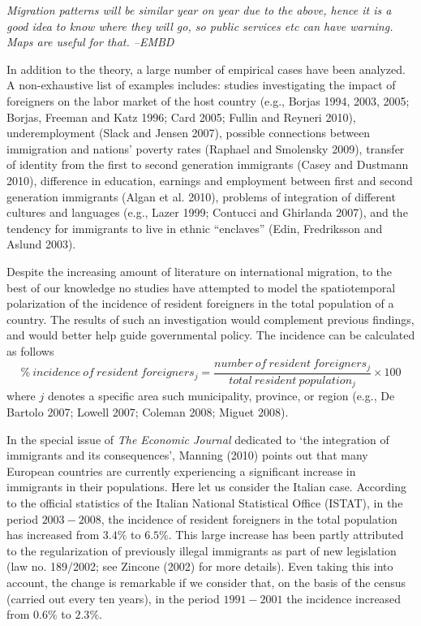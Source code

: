 \documentclass[10pt] {article}
\newcommand{\beq}{\begin{equation}}
\newcommand{\eeq}{\end{equation}}
\theoremstyle{definition}
\theoremstyle{plain}
\begin{document}
\emph{Migration patterns will be similar year on year due to the above, hence it is a good idea to know where they will go, so public services etc can have warning. Maps are useful for that. --EMBD} 

In addition to the theory, a large number of empirical cases have been analyzed. A non-exhaustive list of examples includes: studies investigating the impact of foreigners on the labor market of the host country (e.g., Borjas 1994, 2003, 2005; Borjas, Freeman and Katz 1996; Card 2005; Fullin and Reyneri 2010), underemployment (Slack and Jensen 2007), possible connections between immigration and nations' poverty rates (Raphael and Smolensky 2009), transfer of identity from the first to second generation immigrants (Casey and Dustmann 2010), difference in education, earnings and employment between first and second generation immigrants (Algan et al. 2010), problems of integration of different cultures and languages (e.g., Lazer 1999; Contucci and Ghirlanda 2007), and the tendency for immigrants to live in ethnic ``enclaves'' (Edin, Fredriksson and Aslund 2003). 

Despite the increasing amount of  literature on international migration, to the best of our knowledge no studies have attempted to model the spatiotemporal polarization of the incidence of resident foreigners in the total population of a country. The results of such an investigation would complement previous findings, and would better help guide governmental policy. The incidence can be calculated as follows
\beq
\% \ incidence \ of \ resident \ foreigners_j  = \frac{number \ of \ resident \ foreigners_j}{total \ resident \ population_j} \times 100
\label{first.d1}
\eeq
where $j$ denotes a specific area such municipality, province, or region (e.g., De Bartolo 2007; Lowell 2007; Coleman 2008; Miguet 2008).

In the special issue of \textit{The Economic Journal} dedicated to `the integration of immigrants and its consequences', Manning (2010) points out that many European countries are currently experiencing a significant increase in immigrants in their populations. Here let us consider the Italian case. According to the official statistics of the Italian National Statistical Office (ISTAT), in the period $2003-2008$, the incidence of resident foreigners in the total population has increased from $3.4\%$ to $6.5\%$. This large increase has been partly attributed to the regularization of previously illegal immigrants as part of new legislation (law no. 189/2002; see Zincone (2002) for more details). Even taking this into account, the change is remarkable if we consider that, on the basis of the census (carried out every ten years), in the period $1991-2001$ the incidence increased from $0.6\%$ to $2.3\%$. 
\end{document}
